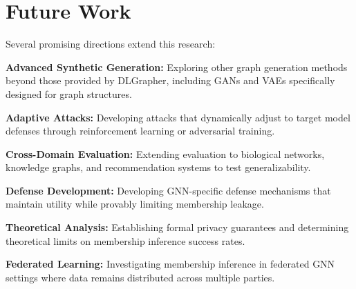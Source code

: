 \documentclass{article}
\begin{document}
\section{Future Work}
Several promising directions extend this research:

\textbf{Advanced Synthetic Generation:} Exploring other graph generation methods beyond those provided by DLGrapher, including GANs and VAEs specifically designed for graph structures.

\textbf{Adaptive Attacks:} Developing attacks that dynamically adjust to target model defenses through reinforcement learning or adversarial training.

\textbf{Cross-Domain Evaluation:} Extending evaluation to biological networks, knowledge graphs, and recommendation systems to test generalizability.

\textbf{Defense Development:} Developing GNN-specific defense mechanisms that maintain utility while provably limiting membership leakage.

\textbf{Theoretical Analysis:} Establishing formal privacy guarantees and determining theoretical limits on membership inference success rates.

\textbf{Federated Learning:} Investigating membership inference in federated GNN settings where data remains distributed across multiple parties.





\end{document}
